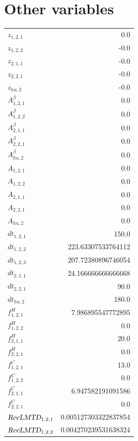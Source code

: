 \documentclass{article}%
\makeatletter
\let\mcnewpage=\newpage%
\newcommand{\TrickSupertabularIntoMulticols}{%
\renewcommand\newpage{%
\if@firstcolumn%
\hrule width\linewidth height0pt%
\columnbreak%
\else%
\mcnewpage%
\fi%
}%
}%
\makeatother
\begin{document}
\section{Other variables}%
\thispagestyle{plain}%
\begin{multicols*}{3}%
\TrickSupertabularIntoMulticols%
%
\begin{supertabular}{lr}%
	$z_{1,2,1}$ & 0.0 \\%
	$z_{1,2,2}$ & -0.0 \\%
	$z_{2,1,1}$ & -0.0 \\%
	$z_{2,2,1}$ & -0.0 \\%
	$z_{hu,2}$ & -0.0 \\%
	$A_{1,2,1}^{\beta}$ & 0.0 \\%
	$A_{1,2,2}^{\beta}$ & 0.0 \\%
	$A_{2,1,1}^{\beta}$ & 0.0 \\%
	$A_{2,2,1}^{\beta}$ & 0.0 \\%
	$A_{hu,2}^{\beta}$ & 0.0 \\%
	$A_{1,2,1}$ & 0.0 \\%
	$A_{1,2,2}$ & 0.0 \\%
	$A_{2,1,1}$ & 0.0 \\%
	$A_{2,2,1}$ & 0.0 \\%
	$A_{hu,2}$ & 0.0 \\%
	$dt_{1,2,1}$ & 150.0 \\%
	$dt_{1,2,2}$ & 223.63307533764112 \\%
	$dt_{1,2,3}$ & 207.72380896746054 \\%
	$dt_{2,1,1}$ & 24.166666666666668 \\%
	$dt_{2,2,1}$ & 90.0 \\%
	$dt_{hu,2}$ & 180.0 \\%
	$f_{1,2,1}^{H}$ & 7.986895547772895 \\%
	$f_{1,2,2}^{H}$ & 0.0 \\%
	$f_{2,1,1}^{H}$ & 20.0 \\%
	$f_{2,2,1}^{H}$ & 0.0 \\%
	$f_{1,2,1}^{C}$ & 13.0 \\%
	$f_{1,2,2}^{C}$ & 0.0 \\%
	$f_{2,1,1}^{C}$ & 6.947582191091586 \\%
	$f_{2,2,1}^{C}$ & 0.0 \\%
	$\textsl{RecLMTD}_{1,2,1}$ & 0.005127303322837854 \\%
	$\textsl{RecLMTD}_{1,2,2}$ & 0.004270239531638324 \\%

\end{supertabular}
\end{multicols*}
\end{document}
